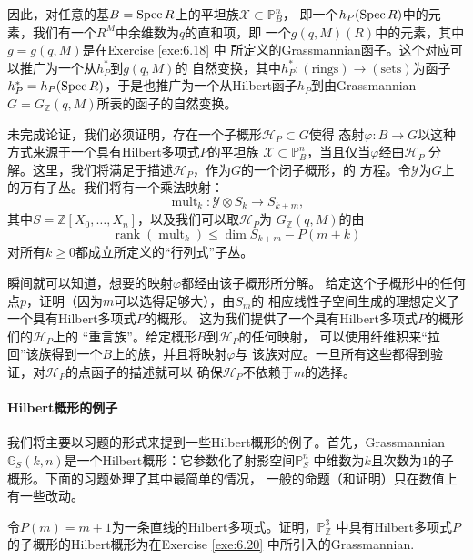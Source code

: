 
因此，对任意的基$B=\operatorname{Spec} R$上的平坦族$\mathscr X\subset \mathbb P_B^n$，
即一个$h_P(\operatorname{Spec} R)$中的元素，我们有一个$R^M$中余维数为$q$的直和项，即
一个$g(q,M)(R)$中的元素，其中$g=g(q,M)$是在Exercise \ref{exe:6.18} 中
所定义的Grassmannian函子。这个对应可以推广为一个从$h_P^*$到$g(q,M)$的
自然变换，其中$h_P^*:(\text{rings})\to (\text{sets})$为函子$h_P^*=
h_P(\operatorname{Spec} R)$，于是也推广为一个从Hilbert函子$h_P$到由Grassmannian
$G=G_{\mathbb Z}(q,M)$所表的函子的自然变换。

未完成论证，我们必须证明，存在一个子概形$\mathscr H_P\subset G$使得
态射$\varphi:B\to G$以这种方式来源于一个具有Hilbert多项式$P$的平坦族
$\mathscr X\subset \mathbb P_B^n$，当且仅当$\varphi$经由$\mathscr H_P$
分解。这里，我们将满足于描述$\mathscr H_P$，作为$G$的一个闭子概形，的
方程。令$\mathscr Y$为$G$上的万有子丛。我们将有一个乘法映射：
\[
    \operatorname{mult}_{k}: \mathscr{Y} \otimes S_{k} \to S_{k+m},
\]
其中$S=\mathbb Z[X_0,\dots,X_n]$，以及我们可以取$\mathscr H_P$为
$G_{\mathbb Z}(q,M)$的由 
\[
    \operatorname{rank}(\operatorname{mult}_{k}) \leq \dim S_{k+m}-P(m+k)
\]
对所有$k\geq 0$都成立所定义的“行列式”子丛。

瞬间就可以知道，想要的映射$\varphi$都经由该子概形所分解。
给定这个子概形中的任何点$p$，证明（因为$m$可以选得足够大），由$S_m$的
相应线性子空间生成的理想定义了一个具有Hilbert多项式$P$的概形。
这为我们提供了一个具有Hilbert多项式$P$的概形们的$\mathscr H_P$上的
“重言族”。给定概形$B$到$\mathscr H_P$的任何映射，
可以使用纤维积来“拉回”该族得到一个$B$上的族，并且将映射$\varphi$与
该族对应。一旦所有这些都得到验证，对$\mathscr H_P$的点函子的描述就可以
确保$\mathscr H_P$不依赖于$m$的选择。

\paragraph*{Hilbert概形的例子}
我们将主要以习题的形式来提到一些Hilbert概形的例子。首先，Grassmannian
$\mathbb G_S(k,n)$是一个Hilbert概形：它参数化了射影空间$\mathbb P_S^n$
中维数为$k$且次数为$1$的子概形。下面的习题处理了其中最简单的情况，
一般的命题（和证明）只在数值上有一些改动。

\begin{exe}\label{exe:6.23}
令$P(m)=m+1$为一条直线的Hilbert多项式。证明，$\mathbb P_{\mathbb Z}^3$
中具有Hilbert多项式$P$的子概形的Hilbert概形为在Exercise \ref{exe:6.20}
中所引入的Grassmannian.
\end{exe}


